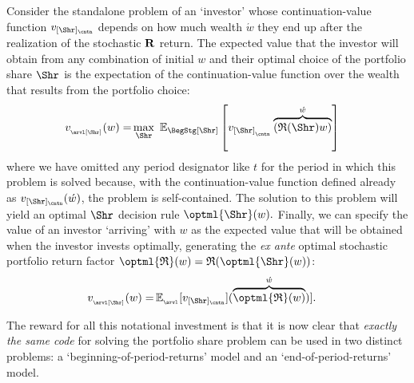 \documentclass[titlepage, headings=optiontotocandhead]{Resources/texmf-local/tex/latex/econtex}
\begin{document}
Consider the standalone problem of an `investor' whose continuation-value function $v_{[\Shr]_\cntn}$ depends on how much wealth $\acute{w}$ they end up after the realization of the stochastic ${\mathbf{R}}$ return.  The expected value that the investor will obtain from any combination of initial $w$ and their optimal choice of the portfolio share $\Shr$ is the expectation of the continuation-value function over the wealth that results from the portfolio choice:
\begin{equation}\begin{gathered}\begin{aligned}
  v_{_\arvl[\Shr]}(w)  = & \max_{\Shr}~ \Ex_{\BegStg[\Shr]}\left[v_{[\Shr]_{_\cntn}}\overbrace{\left(\Rport(\Shr){w}\right)}^{\acute{w}}\right] \label{eq:vMidStgShr}
    \end{aligned}\end{gathered}\end{equation}
where we have omitted any {period} designator like $t$ for the {period} in which this problem is solved because, with the continuation-value function defined already as $v_{[\Shr]_\cntn}(\acute{w})$, the problem is self-contained.  The solution to this problem will yield an optimal $\Shr$ decision rule $\optml{\Shr}(w).$  Finally, we can specify the value of an investor `arriving' with $w$ as the expected value that will be obtained when the investor invests optimally, generating the \textit{ex ante} optimal stochastic portfolio return factor $\optml{\Rport}(w)=\Rport(\optml{\Shr}(w))$:
\begin{equation}\begin{gathered}\begin{aligned}
      v_{_\arvl[\Shr]}(w)  = & \Ex_{_\arvl}[v_{[\Shr]_\cntn}](\overbrace{\optml{\Rport}(w)}^{\acute{w}})].
\end{aligned}\end{gathered}\end{equation}

The reward for all this notational investment is that it is now clear that \emph{exactly the same code} for solving the portfolio share problem can be used in two distinct problems: a `beginning-of-period-returns' model and an `end-of-period-returns' model.

\hypertarget{beginning-returns}{}
\end{document}
